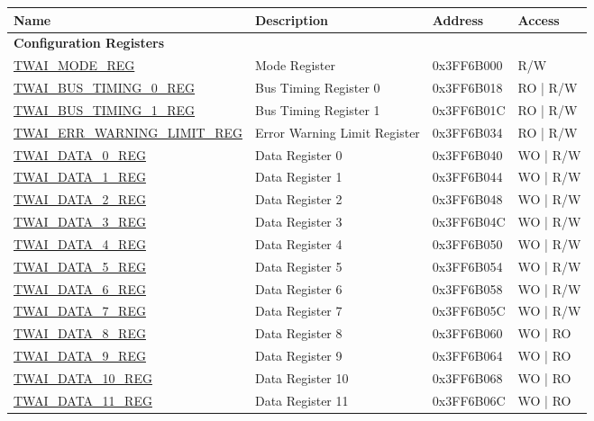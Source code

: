 \begin{longtable}{ | p{6cm} | p{5cm} | p{2.2cm} | p{2cm} | }
\hline\rowcolor{lightgray}
Name & Description &  Address & Access \\ \hline
\endhead
\multicolumn{4}{|l|}{\textbf{Configuration Registers}} \\ \hline
\hyperref[regdesc:TWAIMODEREG]{TWAI\_MODE\_REG} & Mode Register & 0x3FF6B000 & R/W \\ \hline
\hyperref[regdesc:TWAIBUSTIMING0REG]{TWAI\_BUS\_TIMING\_0\_REG} & Bus Timing Register 0 & 0x3FF6B018 & RO | R/W \\ \hline
\hyperref[regdesc:TWAIBUSTIMING1REG]{TWAI\_BUS\_TIMING\_1\_REG} & Bus Timing Register 1 & 0x3FF6B01C & RO | R/W \\ \hline
\hyperref[regdesc:TWAIERRWARNINGLIMITREG]{TWAI\_ERR\_WARNING\_LIMIT\_REG} & Error Warning Limit Register & 0x3FF6B034 & RO | R/W \\ \hline
\hyperref[regdesc:TWAIDATA0REG]{TWAI\_DATA\_0\_REG} & Data Register 0 & 0x3FF6B040 & WO | R/W \\ \hline
\hyperref[regdesc:TWAIDATA1REG]{TWAI\_DATA\_1\_REG} & Data Register 1 & 0x3FF6B044 & WO | R/W \\ \hline
\hyperref[regdesc:TWAIDATA2REG]{TWAI\_DATA\_2\_REG} & Data Register 2 & 0x3FF6B048 & WO | R/W \\ \hline
\hyperref[regdesc:TWAIDATA3REG]{TWAI\_DATA\_3\_REG} & Data Register 3 & 0x3FF6B04C & WO | R/W \\ \hline
\hyperref[regdesc:TWAIDATA4REG]{TWAI\_DATA\_4\_REG} & Data Register 4 & 0x3FF6B050 & WO | R/W \\ \hline
\hyperref[regdesc:TWAIDATA5REG]{TWAI\_DATA\_5\_REG} & Data Register 5 & 0x3FF6B054 & WO | R/W \\ \hline
\hyperref[regdesc:TWAIDATA6REG]{TWAI\_DATA\_6\_REG} & Data Register 6 & 0x3FF6B058 & WO | R/W \\ \hline
\hyperref[regdesc:TWAIDATA7REG]{TWAI\_DATA\_7\_REG} & Data Register 7 & 0x3FF6B05C & WO | R/W \\ \hline
\hyperref[regdesc:TWAIDATA8REG]{TWAI\_DATA\_8\_REG} & Data Register 8 & 0x3FF6B060 & WO | RO \\ \hline
\hyperref[regdesc:TWAIDATA9REG]{TWAI\_DATA\_9\_REG} & Data Register 9 & 0x3FF6B064 & WO | RO \\ \hline
\hyperref[regdesc:TWAIDATA10REG]{TWAI\_DATA\_10\_REG} & Data Register 10 & 0x3FF6B068 & WO | RO \\ \hline
\hyperref[regdesc:TWAIDATA11REG]{TWAI\_DATA\_11\_REG} & Data Register 11 & 0x3FF6B06C & WO | RO \\ \hline

\end{longtable}
